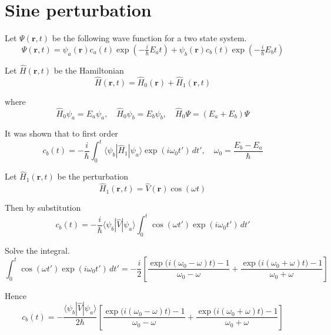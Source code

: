 

\section*{Sine perturbation}

Let $\Psi(\mathbf r,t)$ be the following wave function for a two state system.
\begin{equation*}
\Psi(\mathbf r,t)=\psi_a(\mathbf r)c_a(t)\exp(-\tfrac{i}{\hbar}E_at)+
\psi_b(\mathbf r)c_b(t)\exp(-\tfrac{i}{\hbar}E_bt)
\end{equation*}

Let $\hat H(\mathbf r,t)$ be the Hamiltonian
\begin{equation*}
\hat H(\mathbf r,t)=\hat H_0(\mathbf r)+\hat H_1(\mathbf r,t)
\end{equation*}

where
\begin{equation*}
\hat H_0\psi_a=E_a\psi_a,\quad\hat H_0\psi_b=E_b\psi_b,\quad
\hat H_0\Psi=(E_a+E_b)\Psi
\end{equation*}

It was shown that to first order
\begin{equation*}
c_b(t)=-\frac{i}{\hbar}\int_0^t
\langle\psi_b|\hat H_1|\psi_a\rangle\exp(i\omega_0t')\,dt',\quad\omega_0=\frac{E_b-E_a}{\hbar}
\end{equation*}

Let $\hat H_1(\mathbf r,t)$ be the perturbation
\begin{equation*}
\hat H_1(\mathbf r,t)=\hat V(\mathbf r)\cos(\omega t)
\end{equation*}

Then by substitution
\begin{equation*}
c_b(t)=-\frac{i}{\hbar}\langle\psi_b|\hat V|\psi_a\rangle
\int_0^t\cos(\omega t')\exp(i\omega_0t')\,dt'
\end{equation*}

Solve the integral.
\begin{equation*}
\int_0^t\cos(\omega t')\exp(i\omega_0t')\,dt'
=-\frac{i}{2}
\left[
\frac{\exp\bigl(i(\omega_0-\omega)t\bigr)-1}{\omega_0-\omega}
+\frac{\exp\bigl(i(\omega_0+\omega)t\bigr)-1}{\omega_0+\omega}
\right]
\tag{1}
\end{equation*}

Hence
\begin{equation*}
c_b(t)=-\frac{\langle\psi_b|\hat V|\psi_a\rangle}{2\hbar}
\left[
\frac{\exp\bigl(i(\omega_0-\omega)t\bigr)-1}{\omega_0-\omega}
+\frac{\exp\bigl(i(\omega_0+\omega)t\bigr)-1}{\omega_0+\omega}
\right]
\tag{2}
\end{equation*}

